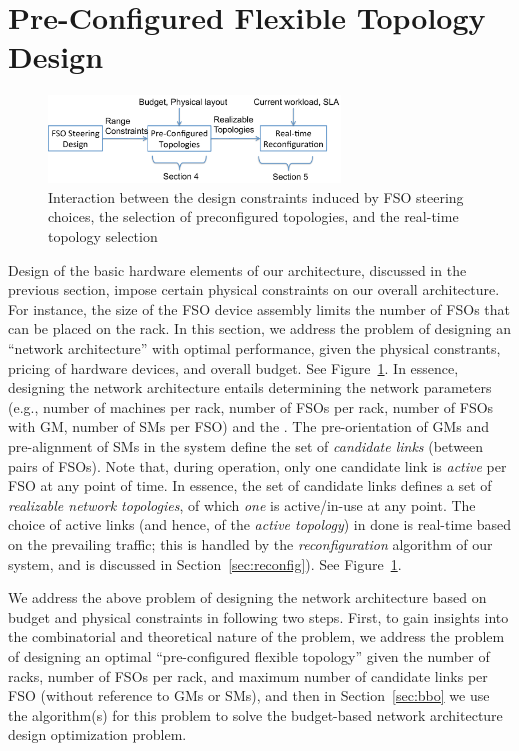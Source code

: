 \section{Pre-Configured Flexible Topology Design}
\label{sec:topology}

\begin{figure}
\centering
\includegraphics[width=220pt]{PPTFigs/OptimizationInteraction.pdf}
\caption{Interaction between the design constraints induced by FSO
steering choices, the selection of preconfigured topologies, and the
real-time topology selection} 
\label{fig:345}
\end{figure}

Design of the basic hardware elements of our architecture, discussed
in the previous section, impose certain physical constraints on our
overall architecture. For instance, the size of the FSO device
assembly limits the number of FSOs that can be placed on the rack. In
this section, we address the problem of designing an ``network
architecture'' with optimal performance, given the physical
constrants, pricing of hardware devices, and overall budget. See
Figure~\ref{fig:345}.
%
In essence, designing the network architecture entails determining the
network parameters (e.g., number of machines per rack, number of FSOs
per rack, number of FSOs with GM, number of SMs per FSO) and the
.  The
pre-orientation of GMs and pre-alignment of SMs in the system define
the set of {\em candidate links} (between pairs of FSOs). Note that,
during operation, only one candidate link is {\em active} per FSO at
any point of time. In essence, the set of candidate links defines a
set of {\em realizable network topologies}, of which {\em one} is
active/in-use at any point. The choice of active links (and hence, of
the {\em active topology}) in done is real-time based on the
prevailing traffic; this is handled by the {\em reconfiguration}
algorithm of our system, and is discussed in
Section~\ref{sec:reconfig}). See Figure~\ref{fig:345}.

We address the above problem of designing the network architecture
based on budget and physical constraints in following two
steps. First, to gain insights into the combinatorial and theoretical
nature of the problem, we address the  problem of designing an optimal ``pre-configured
flexible topology'' given the number of racks, number of FSOs per
rack, and maximum number of candidate links per FSO (without reference
to GMs or SMs), and then in Section~\ref{sec:bbo} we use the
algorithm(s) for this problem to solve the budget-based network
architecture design optimization problem.

